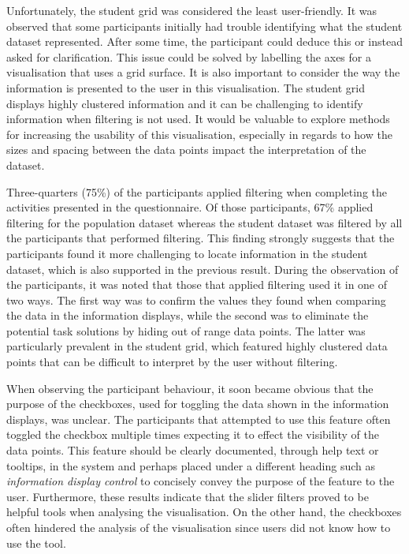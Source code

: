 {{		Unfortunately, the student grid was considered the least user-friendly. It was observed that some participants initially had trouble identifying what the student dataset represented. After some time, the participant could deduce this or instead asked for clarification. This issue could be solved by labelling the axes for a visualisation that uses a grid surface. It is also important to consider the way the information is presented to the user in this visualisation. The student grid displays highly clustered information and it can be challenging to identify information when filtering is not used. It would be valuable to explore methods for increasing the usability of this visualisation, especially in regards to how the sizes and spacing between the data points impact the interpretation of the dataset.

		Three-quarters (75\%) of the participants applied filtering when completing the activities presented in the questionnaire. Of those participants, 67\% applied filtering for the population dataset whereas the student dataset was filtered by all the participants that performed filtering. This finding strongly suggests that the participants found it more challenging to locate information in the student dataset, which is also supported in the previous result. During the observation of the participants, it was noted that those that applied filtering used it in one of two ways. The first way was to confirm the values they found when comparing the data in the information displays, while the second was to eliminate the potential task solutions by hiding out of range data points. The latter was particularly prevalent in the student grid, which featured highly clustered data points that can be difficult to interpret by the user without filtering.

		When observing the participant behaviour, it soon became obvious that the purpose of the checkboxes, used for toggling the data shown in the information displays, was unclear. The participants that attempted to use this feature often toggled the checkbox multiple times expecting it to effect the visibility of the data points. This feature should be clearly documented, through help text or tooltips, in the system and perhaps placed under a different heading such as \emph{information display control} to concisely convey the purpose of the feature to the user. Furthermore, these results indicate that the slider filters proved to be helpful tools when analysing the visualisation. On the other hand, the checkboxes often hindered the analysis of the visualisation since users did not know how to use the tool.

}}
